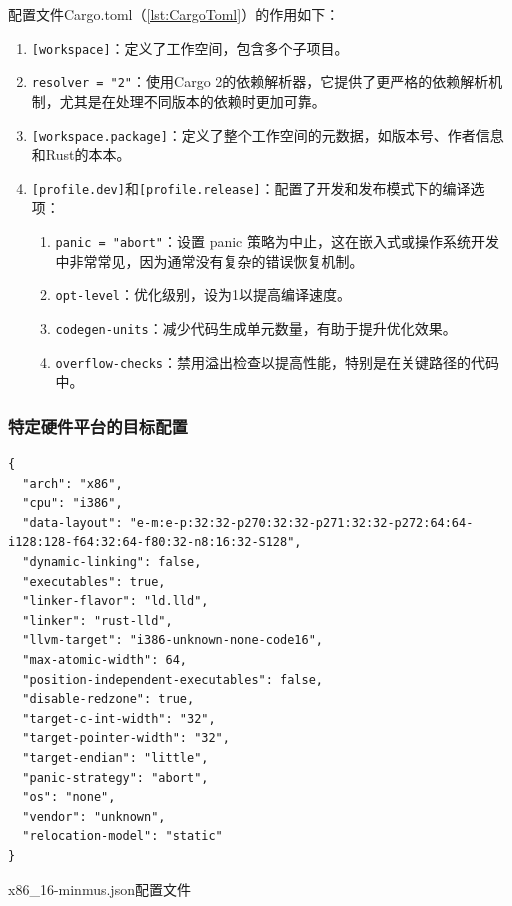 配置文件Cargo.toml（\cref{lst:CargoToml}）的作用如下：

\begin{enumerate}
    \item \texttt{[workspace]}：定义了工作空间，包含多个子项目。
    \item \texttt{resolver = "2"}：使用Cargo 2的依赖解析器，它提供了更严格的依赖解析机制，尤其是在处理不同版本的依赖时更加可靠。
    \item \texttt{[workspace.package]}：定义了整个工作空间的元数据，如版本号、作者信息和Rust的本本。
    \item \texttt{[profile.dev]}和\texttt{[profile.release]}：配置了开发和发布模式下的编译选项：
          \begin{enumerate}
              \item \texttt{panic = "abort"}：设置 panic 策略为中止，这在嵌入式或操作系统开发中非常常见，因为通常没有复杂的错误恢复机制。
              \item \texttt{opt-level}：优化级别，设为1以提高编译速度。
              \item \texttt{codegen-units}：减少代码生成单元数量，有助于提升优化效果。
              \item \texttt{overflow-checks}：禁用溢出检查以提高性能，特别是在关键路径的代码中。
          \end{enumerate}
\end{enumerate}

\subsubsection{特定硬件平台的目标配置}

\begin{listing}[htbp]
    \begin{verbatim}
{
  "arch": "x86",
  "cpu": "i386",
  "data-layout": "e-m:e-p:32:32-p270:32:32-p271:32:32-p272:64:64-i128:128-f64:32:64-f80:32-n8:16:32-S128",
  "dynamic-linking": false,
  "executables": true,
  "linker-flavor": "ld.lld",
  "linker": "rust-lld",
  "llvm-target": "i386-unknown-none-code16",
  "max-atomic-width": 64,
  "position-independent-executables": false,
  "disable-redzone": true,
  "target-c-int-width": "32",
  "target-pointer-width": "32",
  "target-endian": "little",
  "panic-strategy": "abort",
  "os": "none",
  "vendor": "unknown",
  "relocation-model": "static"
}
    \end{verbatim}
    \caption{x86\_16-minmus.json配置文件}\label{lst:x86-16-Minmus}
\end{listing}

